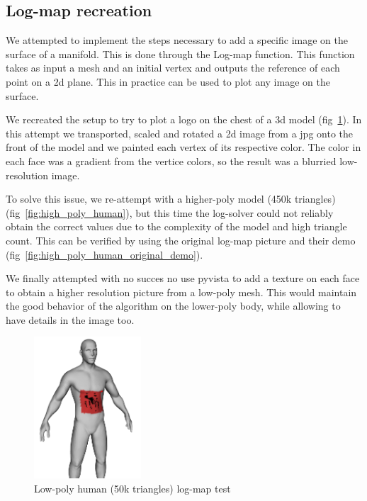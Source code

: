 \documentclass[sigconf]{acmart}
\begin{document}
\subsection{Log-map recreation}

We attempted to implement the steps necessary to add a specific image
on the surface of a manifold. This is done through the Log-map function.
This function takes as input a mesh and an initial vertex and outputs
the reference of each point on a 2d plane. This in practice can be used to
plot any image on the surface.

We recreated the setup to try to plot a logo on the chest of a 3d model
(fig~\ref{fig:low_poly_human}). In this attempt we transported, scaled and rotated a
2d image from a jpg onto the front of the model and we painted each
vertex of its respective color. The color in each face was a gradient from
the vertice colors, so the result was a blurried low-resolution image. 

To solve this issue, we re-attempt with a higher-poly model (450k triangles) (fig~\ref{fig:high_poly_human}),
but this time the log-solver could not reliably obtain the correct values due to the complexity of the model
and high triangle count. This can be verified by using the original log-map
picture and their demo (fig~\ref{fig:high_poly_human_original_demo}).

We finally attempted with no succes no use pyvista to add a texture on each face
to obtain a higher resolution picture from a low-poly mesh. This would maintain
the good behavior of the algorithm on the lower-poly body, while allowing to
have details in the image too. 

\begin{figure}
  \centering
  \includegraphics[width=4cm]{human_spiderman.png}
  \caption{Low-poly human (50k triangles) log-map test}
  \label{fig:low_poly_human}
\end{figure}
\end{document}

